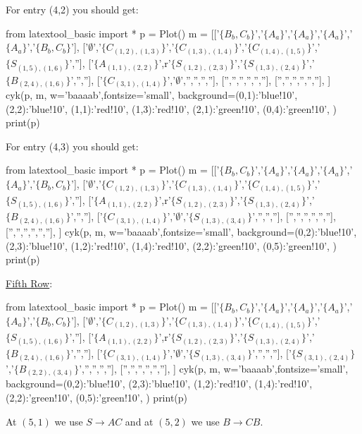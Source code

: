 For entry (4,2) you should get:
\begin{python}
from latextool_basic import *
p = Plot()
m = [['$\{B_b,C_b\}$','$\{A_a\}$','$\{A_a\}$','$\{A_a\}$','$\{A_a\}$','$\{B_b,C_b\}$'],
     ['$\emptyset$','$\{C_{(1,2),(1,3)}\}$','$\{C_{(1,3),(1,4)}\}$','$\{C_{(1,4),(1,5)}\}$','$\{S_{(1,5),(1,6)}\}$',''],
     ['$\{A_{(1,1),(2,2)}\}$',r'$\{S_{(1,2),(2,3)}\}$','$\{S_{(1,3),(2,4)}\}$','$\{B_{(2,4),(1,6)}\}$','',''],
     ['$\{C_{(3,1),(1,4)}\}$','$\emptyset$','','','',''],
     ['','','','','',''],
     ['','','','','',''],
     ]
cyk(p, m, w='baaaab',fontsize='small',
    background={(0,1):'blue!10',  (2,2):'blue!10',
                (1,1):'red!10',   (1,3):'red!10',
                (2,1):'green!10', (0,4):'green!10',
    })
print(p)
\end{python}


For entry (4,3) you should get:
\begin{python}
from latextool_basic import *
p = Plot()
m = [['$\{B_b,C_b\}$','$\{A_a\}$','$\{A_a\}$','$\{A_a\}$','$\{A_a\}$','$\{B_b,C_b\}$'],
     ['$\emptyset$','$\{C_{(1,2),(1,3)}\}$','$\{C_{(1,3),(1,4)}\}$','$\{C_{(1,4),(1,5)}\}$','$\{S_{(1,5),(1,6)}\}$',''],
     ['$\{A_{(1,1),(2,2)}\}$',r'$\{S_{(1,2),(2,3)}\}$','$\{S_{(1,3),(2,4)}\}$','$\{B_{(2,4),(1,6)}\}$','',''],
     ['$\{C_{(3,1),(1,4)}\}$','$\emptyset$','$\{S_{(1,3),(3,4)}\}$','','',''],
     ['','','','','',''],
     ['','','','','',''],
     ]
cyk(p, m, w='baaaab',fontsize='small',
    background={(0,2):'blue!10',  (2,3):'blue!10',
                (1,2):'red!10',   (1,4):'red!10',
                (2,2):'green!10', (0,5):'green!10',
    })
print(p)
\end{python}


\underline{Fifth Row}:
\begin{python}
from latextool_basic import *
p = Plot()
m = [['$\{B_b,C_b\}$','$\{A_a\}$','$\{A_a\}$','$\{A_a\}$','$\{A_a\}$','$\{B_b,C_b\}$'],
     ['$\emptyset$','$\{C_{(1,2),(1,3)}\}$','$\{C_{(1,3),(1,4)}\}$','$\{C_{(1,4),(1,5)}\}$','$\{S_{(1,5),(1,6)}\}$',''],
     ['$\{A_{(1,1),(2,2)}\}$',r'$\{S_{(1,2),(2,3)}\}$','$\{S_{(1,3),(2,4)}\}$','$\{B_{(2,4),(1,6)}\}$','',''],
     ['$\{C_{(3,1),(1,4)}\}$','$\emptyset$','$\{S_{(1,3),(3,4)}\}$','','',''],
     ['$\{S_{(3,1),(2,4)}\}$','$\{B_{(2,2),(3,4)}\}$','','','',''],
     ['','','','','',''],
     ]
cyk(p, m, w='baaaab',fontsize='small',
    background={(0,2):'blue!10',  (2,3):'blue!10',
                (1,2):'red!10',   (1,4):'red!10',
                (2,2):'green!10', (0,5):'green!10',
    })
print(p)
\end{python}
At $(5, 1)$ we use $S \rightarrow AC$ and at $(5,2)$ we use $B \rightarrow CB$.



